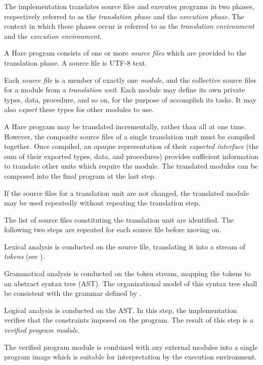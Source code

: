 
\specitem
The implementation translates source files and executes programs in two phases,
respectively referred to as the \textit{translation phase} and the
\textit{execution phase}. The context in which these phases occur is referred
to as the \textit{translation environment} and the \textit{execution
environment}.


\specsubitem
A Hare program consists of one or more \textit{source files} which are provided
to the translation phase. A source file is UTF-8 text.

\specsubitem
Each \textit{source file} is a member of exactly one \textit{module}, and the
collective source files for a module from a \textit{translation unit}. Each
module may define its own private types, data, procedure, and so on, for the
purpose of accomplish its tasks. It may also \textit{export} these types for
other modules to use.

\specsubitem
A Hare program may be translated incrementally, rather than all at one time.
However, the composite source files of a single translation unit must be
compiled together. Once compiled, an opaque representation of their
\textit{exported interface} (the sum of their exported types, data, and
procedures) provides sufficient information to translate other units which
require the module. The translated modules can be composed into the final
program at the last step.

\specsubitem
If the source files for a translation unit are not changed, the translated
module may be used repeatedly without repeating the translation step.


\specsubitem
The list of source files constituting the translation unit are identified. The
following two steps are repeated for each source file before moving on.

\specsubitem
Lexical analysis is conducted on the source file, translating it into a stream
of \textit{tokens} (see ).

\specsubitem
Grammatical analysis is conducted on the token stream, mapping the tokens to an
abstract syntax tree (AST). The organizational model of this syntax tree shall
be consistent with the grammar defined by .

\specsubitem
Logical analysis is conducted on the AST. In this step, the implementation
verifies that the constraints imposed on the program. The result of this step is
a \textit{verified program module}.

\specsubitem
The verified program module is combined with any external modules into a single
program image which is suitable for interpretation by the execution environment.
